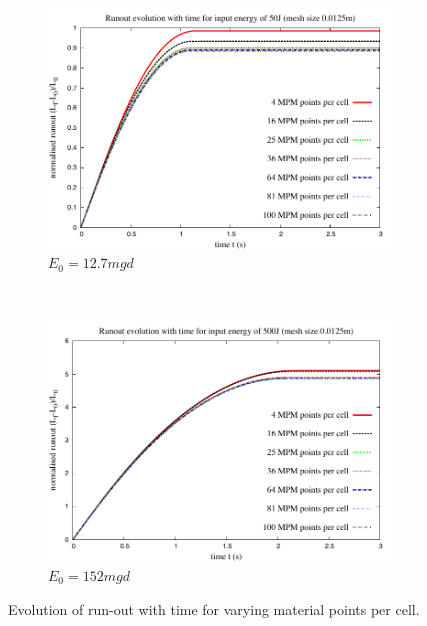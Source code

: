 \begin{figure}[tbhp]
\centering
\begin{subfigure}[b]{0.95\textwidth}
\includegraphics[width=\textwidth]{Runout_50}
\caption{$E_0=12.7mgd$}
\label{fig:Runout_50}
\end{subfigure}
\\
\begin{subfigure}[b]{0.95\textwidth}
\centering
\includegraphics[width=\textwidth]{Runout_500}
\caption{$E_0=152mgd$}
\label{fig:Runout_500}
\end{subfigure}
\caption{Evolution of run-out with time for varying material points per cell.}
\label{fig:Runout_MPM}
\end{figure}


